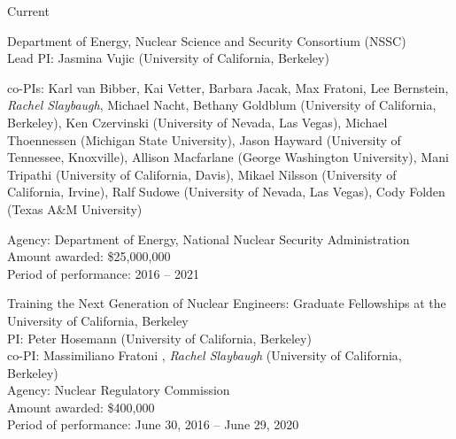 \begin{rSubsection}{Current}{}{}{}
\vspace*{0.3 em}
\item Department of Energy, Nuclear Science and Security Consortium (NSSC)\\
Lead PI: Jasmina Vujic (University of California, Berkeley)
\vspace*{-.6 em}
\begin{addmargin}[1em]{0 em}
co-PIs: Karl van Bibber, Kai Vetter, Barbara Jacak, Max Fratoni, Lee Bernstein, \textit{Rachel Slaybaugh}, Michael Nacht, Bethany Goldblum (University of California, Berkeley), Ken Czervinski (University of Nevada, Las Vegas), Michael Thoennessen (Michigan State University), Jason Hayward (University of Tennessee, Knoxville), Allison Macfarlane (George Washington University), Mani Tripathi (University of California, Davis), Mikael Nilsson (University of California, Irvine), Ralf Sudowe (University of Nevada, Las Vegas), Cody Folden (Texas A\&M University)
\end{addmargin}
\vspace*{-.6 em}
Agency:  Department of Energy, National Nuclear Security Administration\\
Amount awarded: \$25,000,000\\
Period of performance: 2016 -- 2021

\vspace*{0.3 em}
\item Training the Next Generation of Nuclear Engineers: Graduate Fellowships at the University of California, Berkeley	\\
PI: Peter Hosemann (University of California, Berkeley) \\
\hspace*{1 em} co-PI: Massimiliano Fratoni , \textit{Rachel Slaybaugh} (University of California, Berkeley)\\
Agency: Nuclear Regulatory Commission \\
Amount awarded: \$400,000\\
Period of performance: June 30, 2016 -- June 29, 2020
\end{rSubsection}


